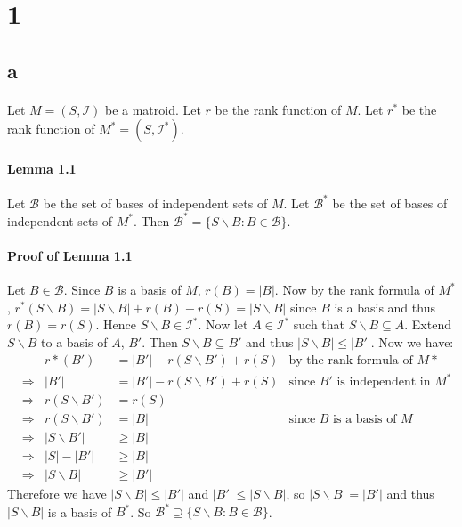 \documentclass[letterpaper,12pt,oneside,onecolumn]{report}
\begin{document}
\section*{1}
\subsection*{a}
\paragraph{}
Let $M=(S,\mathcal{I})$ be a matroid. Let $r$ be the rank function of $M$. Let $r^*$ be the rank function of $M^* = (S, \mathcal{I}^*)$.
\paragraph{Lemma 1.1}
Let $\mathcal{B}$ be the set of bases of independent sets of $M$. Let $\mathcal{B}^*$ be the set of bases of independent sets of $M^*$. Then $\mathcal{B}^* = \{S\backslash B : B \in \mathcal{B}\}$.
\paragraph{Proof of Lemma 1.1}
Let $B \in \mathcal{B}$. Since $B$ is a basis of $M$, $r(B) = |B|$. Now by the rank formula of $M^*$, $r^*(S\backslash B) = |S \backslash B| + r(B) - r(S) = |S \backslash B|$ since $B$ is a basis and thus $r(B) = r(S)$. Hence $S \backslash B \in \mathcal{I}^*$. Now let $A \in \mathcal{I}^*$ such that $S\backslash B \subseteq A$. Extend $S\backslash B$ to a basis of $A$, $B'$. Then $S\backslash B \subseteq B'$ and thus $|S\backslash B| \leq |B'|$. Now we have: 
\begin{align*}
&\ &r*(B') &= |B'| - r(S\backslash B') + r(S) &\text{by the rank formula of $M*$}\\
&\Rightarrow &|B'| &= |B'| - r(S\backslash B') + r(S) &\text{since $B'$ is independent in $M^*$}\\
&\Rightarrow &r(S\backslash B') &= r(S) \\
&\Rightarrow &r(S\backslash B') &= |B| &\text{since $B$ is a basis of $M$}\\
&\Rightarrow &|S\backslash B'| &\geq |B| \\
&\Rightarrow &|S| - |B'| &\geq |B| \\
&\Rightarrow &|S\backslash B| &\geq |B'|
\end{align*}
Therefore we have $|S\backslash B| \leq |B'|$ and $|B'| \leq |S\backslash B|$, so $|S\backslash B| = |B'|$ and thus $|S\backslash B|$ is a basis of $B^*$. So $\mathcal{B}^* \supseteq \{S\backslash B : B \in \mathcal{B}\}$.
\end{document}

